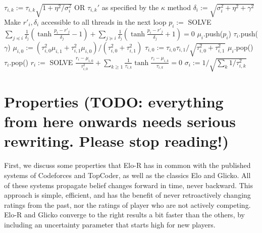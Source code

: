 \documentclass{article}
\begin{document}
\begin{algorithm}
\caption{$update()$}
\label{alg:update}
\begin{algorithmic}
\STATE $\tau_{i,k} := \tau_{i,k} \sqrt{1 + \eta^2/\sigma_i^2}$ OR $\tau_{i,k}'$ as specified by the $\kappa$ method
\ENDFOR
\STATE $\delta_i := \sqrt{\sigma_i^2 + \eta^2 + \gamma^2}$
\STATE Make $r'_i,\delta_i$ accessible to all threads in the next loop
\ENDFOR
{}
\STATE $p_i := $ SOLVE $\sum_{j\preceq i}\frac{1}{\delta_j}\left( \tanh\frac {p_i - r'_j} {\delta_j} - 1 \right) + \sum_{j\succeq i}\frac{1}{\delta_j}\left( \tanh\frac {p_i - r'_j} {\delta_j} + 1 \right) = 0$
\STATE $\mu_i$.push($p_i$)
\STATE $\tau_i$.push($\gamma$)
\STATE $\mu_{i,0} := \left( \tau_{i,0}^2 \mu_{i,1} + \tau_{i,1}^2 \mu_{i,0} \right) / \left( \tau_{i,0}^2 + \tau_{i,1}^2 \right)$
\STATE $\tau_{i,0} := \tau_{i,0}\tau_{i,1} / \sqrt{ \tau_{i,0}^2 + \tau_{i,1}^2 }$
\STATE $\mu_i$.pop()
\STATE $\tau_i$.pop()
\ENDIF
\STATE $r_i := $ SOLVE $\frac{r_i-\mu_{i,0}}{\tau_{i,0}^2} + \sum_{k\ge 1} \frac{1}{\tau_{i,k}} \tanh \frac {r_i-\mu_{i,k}} {\tau_{i,k}} = 0$
\STATE $\sigma_i := 1 / \sqrt{\sum_k 1/\tau_{i,k}^2}$
\ENDFOR
\end{algorithmic}
\end{algorithm}

\pagebreak

\section{Properties (TODO: everything from here onwards needs serious rewriting. Please stop reading!)}

First, we discuss some properties that Elo-R has in common with the published systems of Codeforces and TopCoder, as well as the classics Elo and Glicko. All of these systems propagate belief changes forward in time, never backward. This approach is simple, efficient, and has the benefit of never retroactively changing ratings from the past, nor the ratings of player who are not actively competing. Elo-R and Glicko converge to the right results a bit faster than the others, by including an uncertainty parameter that starts high for new players.
\end{document}
